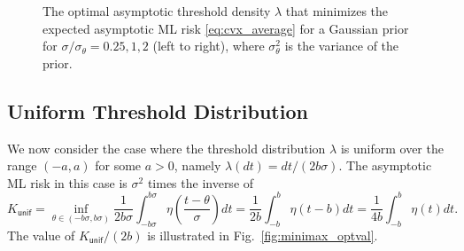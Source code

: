 \documentclass[letterpaper, conference]{IEEEtran}      %
\newcommand{\unif}{\mathsf{unif}}
\begin{document}
\begin{figure}
\begin{center}
\begin{tikzpicture}
\end{tikzpicture}
\caption{\label{fig:opt_density}
The optimal asymptotic threshold density $\lambda$ that minimizes the expected asymptotic ML risk \eqref{eq:cvx_average} for a Gaussian prior for
 $\sigma/\sigma_\theta=0.25,1,2$ (left to right), where $\sigma_\theta^2$ is the variance of the prior. 
}
\end{center}
\end{figure}

\subsection{Uniform Threshold Distribution}
We now consider the case where the threshold distribution $\lambda$ is uniform over the range $(-a,a)$ for some $a>0$, namely
$\lambda(dt) = dt/(2b\sigma)$. The asymptotic ML risk in this case is $\sigma^2$ times the inverse of
\begin{equation}
K_{\unif} = \inf_{\theta \in (-b\sigma,b\sigma)} \frac{1}{2b\sigma}\int_{-b\sigma}^{b\sigma} \eta\left(\frac{t-\theta}{\sigma}\right) dt =  \frac{1}{2b}\int_{-b}^{b} \eta(t-b) dt = \frac{1}{4b}\int_{-b}^b \eta(t) dt. \label{eq:uniform_risk}
\end{equation}
The value of $K_{\unif} / (2b)$ is illustrated in Fig.~\ref{fig:minimax_optval}. 
\end{document}
